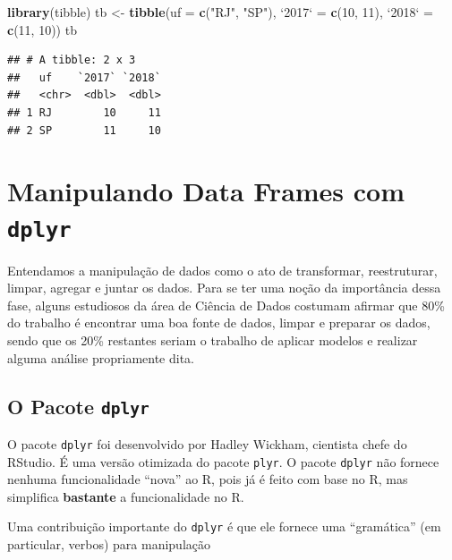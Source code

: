 \documentclass[]{book}
\newenvironment{Shaded}{\begin{snugshade}}{\end{snugshade}}
\newcommand{\DataTypeTok}[1]{\textcolor[rgb]{0.13,0.29,0.53}{#1}}
\newcommand{\DecValTok}[1]{\textcolor[rgb]{0.00,0.00,0.81}{#1}}
\newcommand{\KeywordTok}[1]{\textcolor[rgb]{0.13,0.29,0.53}{\textbf{#1}}}
\newcommand{\NormalTok}[1]{#1}
\newcommand{\StringTok}[1]{\textcolor[rgb]{0.31,0.60,0.02}{#1}}
\begin{document}
\begin{Shaded}
\begin{Highlighting}[]
\KeywordTok{library}\NormalTok{(tibble)}
\NormalTok{tb <-}\StringTok{ }\KeywordTok{tibble}\NormalTok{(}\DataTypeTok{uf =} \KeywordTok{c}\NormalTok{(}\StringTok{"RJ"}\NormalTok{, }\StringTok{"SP"}\NormalTok{), }\StringTok{`}\DataTypeTok{2017}\StringTok{`}\NormalTok{ =}\StringTok{ }\KeywordTok{c}\NormalTok{(}\DecValTok{10}\NormalTok{, }\DecValTok{11}\NormalTok{), }\StringTok{`}\DataTypeTok{2018}\StringTok{`}\NormalTok{ =}\StringTok{ }\KeywordTok{c}\NormalTok{(}\DecValTok{11}\NormalTok{, }\DecValTok{10}\NormalTok{))}
\NormalTok{tb}
\end{Highlighting}
\end{Shaded}

\begin{verbatim}
## # A tibble: 2 x 3
##   uf    `2017` `2018`
##   <chr>  <dbl>  <dbl>
## 1 RJ        10     11
## 2 SP        11     10
\end{verbatim}

\hypertarget{method}{%
\chapter{\texorpdfstring{Manipulando Data Frames com \texttt{dplyr}}{Manipulando Data Frames com dplyr}}\label{method}}

Entendamos a manipulação de dados como o ato de transformar, reestruturar, limpar, agregar e juntar os dados. Para se ter uma noção da importância dessa fase, alguns estudiosos da área de Ciência de Dados costumam afirmar que 80\% do trabalho é encontrar uma boa fonte de dados, limpar e preparar os dados, sendo que os 20\% restantes seriam o trabalho de aplicar modelos e realizar alguma análise propriamente dita.

\hypertarget{o-pacote-dplyr}{%
\section{\texorpdfstring{O Pacote \texttt{dplyr}}{O Pacote dplyr}}\label{o-pacote-dplyr}}

O pacote \texttt{dplyr} foi desenvolvido por Hadley Wickham, cientista chefe do RStudio. É uma versão otimizada do pacote \texttt{plyr}. O pacote \texttt{dplyr} não fornece nenhuma funcionalidade ``nova'' ao R, pois já é feito com base no R, mas simplifica \textbf{bastante} a funcionalidade no R.

Uma contribuição importante do \texttt{dplyr} é que ele fornece uma ``gramática'' (em particular, verbos) para manipulação
\end{document}
